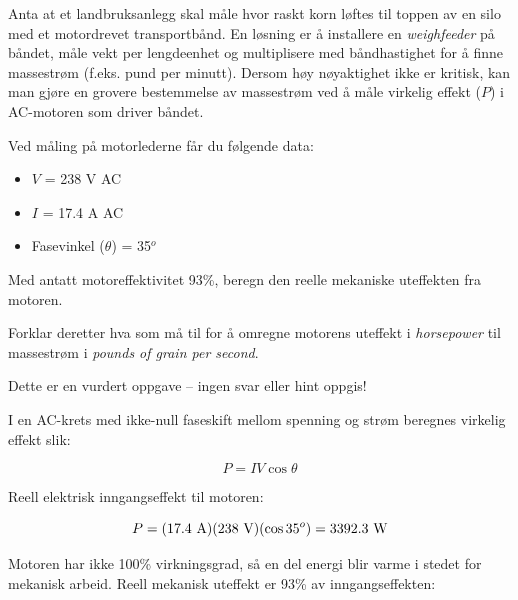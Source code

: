 

Anta at et landbruksanlegg skal måle hvor raskt korn løftes til toppen av en silo med et motordrevet transportbånd. En løsning er å installere en {\it weighfeeder} på båndet, måle vekt per lengdeenhet og multiplisere med båndhastighet for å finne massestrøm (f.eks. pund per minutt). Dersom høy nøyaktighet ikke er kritisk, kan man gjøre en grovere bestemmelse av massestrøm ved å måle virkelig effekt ($P$) i AC-motoren som driver båndet.

\vskip 10pt

Ved måling på motorlederne får du følgende data:

\begin{itemize}
\item{} $V$ = 238 V AC
\item{} $I$ = 17.4 A AC
\item{} Fasevinkel ($\theta$) = 35$^{o}$
\end{itemize}

Med antatt motoreffektivitet 93\%, beregn den reelle mekaniske uteffekten fra motoren.

\vskip 10pt

Forklar deretter hva som må til for å omregne motorens uteffekt i {\it horsepower} til massestrøm i {\it pounds of grain per second}.

\vfil 

\eject






Dette er en vurdert oppgave -- ingen svar eller hint oppgis!







I en AC-krets med ikke-null faseskift mellom spenning og strøm beregnes virkelig effekt slik:

$$P = I V \cos \theta$$

Reell elektrisk inngangseffekt til motoren:

$$P = (17.4 \hbox{ A}) (238 \hbox{ V}) (\cos 35^o) = 3392.3 \hbox{ W}$$

Motoren har ikke 100\% virkningsgrad, så en del energi blir varme i stedet for mekanisk arbeid. Reell mekanisk uteffekt er 93\% av inngangseffekten:

